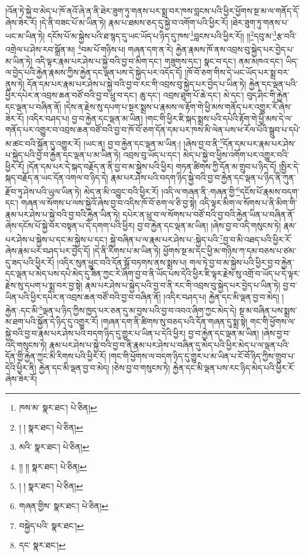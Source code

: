 །འོན་ཏེ་སྐྱེ་བ་མེད་པ་ཁོ་ནའོ་ཞེ་ན་ནི་ཐེར་ཟུག་ཏུ་གནས་པར་སྨྲ་བར་ཁས་བླངས་པའི་ཕྱིར་ཕྱོགས་སྔ་མ་ལ་གནོད་དོ་ཞེས་ཟེར་རོ། །དེ་ནི་བཟང་པོ་མ་ཡིན་ཏེ། རྣམ་པ་ཐམས་ཅད་དུ་སྐྱེ་བ་འགོག་པའི་ཕྱིར་རོ། །ཐེར་ཟུག་ཏུ་གནས་པ་ཡང་མ་ཡིན་ཏེ། དངོས་པོ་མ་སྐྱེས་པའི་ཐ་སྙད་དུ་ཡང་ཡོད་པ་ཉིད་དུ་ཁས་\footnote{ཁས་མ་  སྣར་ཐང་།  པེ་ཅིན། }བླངས་པའི་ཕྱིར་རོ།། །།\footnote{། །  སྣར་ཐང་།  པེ་ཅིན། }དབུ་མ་\footnote{མའི་  སྣར་ཐང་།  པེ་ཅིན། }རྩ་བའི་འགྲེལ་པ་ཤེས་རབ་སྒྲོན་མ། \footnote{།། །།  སྣར་ཐང་།  པེ་ཅིན། }བམ་པོ་གཉིས་པ། གཞན་དག་ན་རེ། རྐྱེན་རྣམས་ཁོ་ནས་འབྲས་བུ་སྐྱེད་པར་བྱེད་པ་མ་ཡིན་ཏེ། འདི་ལྟར་རྣམ་པར་ཤེས་པ་སྐྱེ་བའི་བྱ་བ་མིག་དང་། གཟུགས་དང་། སྣང་བ་དང་། ནམ་མཁའ་དང་། ཡིད་ལ་བྱེད་པའི་རྐྱེན་རྣམས་ཀྱིས་རྐྱེན་དང་ལྡན་པས་དེ་སྐྱེད་པར་འདོད་དོ། །ཁོ་བོ་ཅག་གིས་དེ་ཡང་ཡོད་པར་སྨྲ་བར་ནུས་ཏེ། དོན་དམ་པར་རྣམ་པར་ཤེས་པ་སྐྱེ་བའི་བྱ་བ་རང་གི་འབྲས་བུ་སྐྱེད་པར་བྱེད་པ་ཡིན་ཏེ། རྐྱེན་དང་ལྡན་པའི་ཕྱིར་དཔེར་ན་འབྲས་ཆན་བཙོ་བའི་བྱ་བ་ཕྲུ་བ་དང་། ཆུ་དང་། འབྲས་ཐུག་པོ་ཆེ་དང་། མེ་དང་། བུད་ཤིང་གི་རྐྱེན་དང་ལྡན་པ་བཞིན་ནོ། །དེས་ན་རྗེས་སུ་དཔག་པ་སྔར་སྨྲས་པ་རྣམས་ལ་རྟོག་གེ་ཕྱི་མས་གནོད་པར་འགྱུར་རོ་ཞེས་ཟེར་རོ། །འདིར་བཤད་པ། བྱ་བ་རྐྱེན་དང་ལྡན་མ་ཡིན། །གང་གི་ཕྱིར་ཇི་སྐད་སྨྲས་པའི་དཔེའི་རྟོག་གེ་ཕྱི་མས་དེ་ལ་གནོད་པར་འགྱུར་བ་འབྲས་ཆན་བཙོ་བའི་བྱ་བ་ཁོ་བོ་ཅག་དོན་དམ་པར་ཁས་མི་ལེན་པས་ཕ་རོལ་པོའི་སྒྲུབ་པ་དཔེ་མ་ཚང་བའི་སྐྱོན་དུ་འགྱུར་རོ། །ཡང་ན། བྱ་བ་རྐྱེན་དང་ལྡན་མ་ཡིན:། །ཞེས་བྱ་བ་ནི་\footnote{། །  སྣར་ཐང་།  པེ་ཅིན། }དོན་དམ་པར་རྣམ་པར་ཤེས་པ་སྐྱེད་པའི་བྱ་བ་རྐྱེན་དང་ལྡན་པ་མ་ཡིན་ཏེ། འབྲས་བུ་ཡོད་པ་དང་། མེད་པ་སྐྱེ་བ་ཕྱིས་འགོག་པར་འགྱུར་བའི་ཕྱིར་རོ། །དོན་དམ་པར་དེ་སྐད་བརྗོད་ན་ནི་བྱ་བ་མ་སྐྱེས་པའི་ཕྱིར། གཏན་ཚིགས་ཀྱི་དོན་མ་གྲུབ་པ་ཉིད་དོ། །སྤྱིར་དེ་སྐད་བརྗོད་ན་ཡང་དོན་འགལ་བ་ཉིད་དེ། རྣམ་པར་ཤེས་པའི་བདག་ཉིད་སྐྱེ་བའི་བྱ་བ་རྐྱེན་དང་ལྡན་པ་ཉིད་ནི་ཀུན་རྫོབ་ཏུ་ཤེས་པའི་ཡུལ་ཡིན་ཏེ། མེད་ན་མི་འབྱུང་བའི་ཕྱིར་རོ། །འདི་ལ་གཞན་ནི་:གཞན་གྱི་\footnote{གཞན་གྱིས་  སྣར་ཐང་།  པེ་ཅིན། }དངོས་པོ་རྣམས་བདག་དང་། གཞན་ལ་སོགས་པ་ལས་སྐྱེའོ་ཞེས་བྱ་བ་འདིས་ཁོ་བོ་ཅག་ལ་ཅི་བྱ་སྟེ། འདི་ལྟར་མིག་ལ་སོགས་པ་ནི་མིག་གི་རྣམ་པར་ཤེས་པ་སྐྱེ་བའི་བྱ་བའི་རྐྱེན་ཡིན་ཏེ། དཔེར་ན་ཕྲུ་བ་ལ་སོགས་པ་བཙོ་བའི་བྱ་བའི་རྐྱེན་ཡིན་པ་བཞིན་ནོ་ཞེས་དངོས་པོ་སྐྱེ་བར་བསྟན་པ་དེ་དགག་པའི་ཕྱིར། བྱ་བ་རྐྱེན་དང་ལྡན་མ་ཡིན། །ཞེས་བྱ་བ་འདི་གསུངས་ཏེ། རྣམ་པར་ཤེས་པ་སྐྱེས་པ་དང་མ་སྐྱེས་པ་དང་། སྐྱེ་བཞིན་པ་ལ་རྣམ་པར་ཤེས་པ་:སྐྱེད་པའི་\footnote{བསྐྱེད་པའི་  སྣར་ཐང་། }བྱ་བ་མི་འཐད་པའི་ཕྱིར་རོ་ཞེས་རྣམ་པར་བཤད་པར་བྱེད་དོ། །དེ་ནི་རིགས་པ་མ་ཡིན་ཏེ། ཕྱོགས་སྔ་མ་དང་ཕྱི་མ་གཉིས་ཀ་དམ་བཅས་པ་ཙམ་དུ་ཟད་པའི་ཕྱིར་རོ། །འདིར་སུན་ཕྱུང་བའི་དོན་སྒྲོ་བཏགས་ནས་སྨྲས་པ། གལ་ཏེ་བྱ་བ་མ་སྐྱེས་པའི་ཕྱིར་བྱ་བ་རྐྱེན་དང་ལྡན་པ་མེད་པས་དཔེ་མེད་དུ་ཟིན་ཀྱང་རེ་ཞིག་བྱ་བ་ནི་ཡོད་པས་དེའི་ཕྱིར་ཇི་ལྟར་རྗེས་སུ་འགྲོ་བ་ཡོད་པ་དེ་ལྟར་རྗེས་སུ་དཔག་པ་སྨྲ་བར་བྱ་སྟེ། རྣམ་པར་ཤེས་པ་སྐྱེད་པའི་བྱ་བ་ནི་རང་གི་འབྲས་བུ་སྐྱེད་པར་བྱེད་པ་ཡིན་ཏེ། བྱ་བ་ཡིན་པའི་ཕྱིར་དཔེར་ན་འབྲས་ཆན་བཙོ་བའི་བྱ་བ་བཞིན་ནོ། །འདིར་བཤད་པ། རྐྱེན་དང་མི་ལྡན་བྱ་བ་མེད། །རྐྱེན་:དང་མི་\footnote{དང་  སྣར་ཐང་། }ལྡན་པ་ཉིད་ཀྱིས་ཁྱད་པར་ཅན་དུ་མ་བྱས་པའི་བྱ་བ་འབའ་ཞིག་ཀྱང་མེད་དེ། སྔ་མ་བཞིན་པས་སྨྲས་མ་ཐག་པའི་སྐྱོན་དེ་ཉིད་དུ་འགྱུར་རོ། །གཞན་དག་ནི་ཚིགས་སུ་བཅད་པའི་དོན་གཞན་དུ་སྨྲ་སྟེ། གང་གི་ཕྱོགས་ལ་སྐྱེ་བའི་བྱ་བ་རྣམ་པར་ཤེས་པའི་བདག་ཉིད་དུ་གྱུར་པ་ཡིན་པ་དེའི་ཕྱིར། བྱ་བ་རྐྱེན་དང་ལྡན་མ་ཡིན། །ཞེས་བྱ་བ་འདི་གསུངས་ཏེ། རྣམ་པར་ཤེས་པ་སྐྱེ་བའི་བྱ་བ་ནི་རྣམ་པར་ཤེས་པ་བཞིན་དུ་མེད་པའི་ཕྱིར་མེད་པ་ལ་ལྡན་པའི་དོན་གྱི་རྐྱེན་ཀྱང་མི་རིགས་པའི་ཕྱིར་རོ། །གང་གི་ཕྱོགས་ལ་བདག་ཉིད་དུ་གྱུར་པ་མ་ཡིན་པ་ངོ་བོ་ཉིད་ཀྱིས་གྲུབ་པ་དེའི་ཕྱིར་ནི། རྐྱེན་དང་མི་ལྡན་བྱ་བ་མེད། །ཅེས་བྱ་བ་གསུངས་ཏེ། རྐྱེན་དང་མི་ལྡན་པས་རང་ཉིད་མེད་པའི་ཕྱིར་རོ་ཞེས་ཟེར་རོ། 